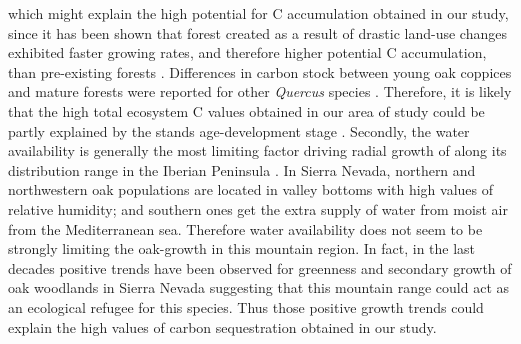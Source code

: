 which might explain the high potential for C accumulation obtained in our study, since it has been shown that forest created as a result of drastic land-use changes exhibited faster growing rates, and therefore higher potential C accumulation, than pre-existing forests \autocite{VilaCabreraetal2017NewForests}. Differences in carbon stock between young oak coppices and mature forests were reported for other \emph{Quercus} species \autocite{Bruckmanetal2011CarbonPools,Cotillasetal2016AbovegroundBelowground}. Therefore, it is likely that the high total ecosystem C values obtained in our area of study could be partly explained by the stands age-development stage \autocite{Makinecietal2015EcosystemCarbon}. Secondly, the water availability is generally the most limiting factor driving radial growth of \Qp along its distribution range in the Iberian Peninsula \autocite{GeaIzquierdoCanellas2014LocalClimate}. In Sierra Nevada, northern and northwestern oak populations are located in valley bottoms with high values of relative humidity; and southern ones get the extra supply of water from moist air from the Mediterranean sea. Therefore water availability does not seem to be strongly limiting the oak-growth in this mountain region. In fact, in the last decades positive trends have been observed for greenness and secondary growth of oak woodlands in Sierra Nevada \autocite{GeaIzquierdoCanellas2014LocalClimate,PerezLuqueetal2020LanduseLegacies,RubioCuadradoetal2018AbioticFactors} suggesting that this mountain range could act as an ecological refugee for this species. Thus those positive growth trends could explain the high values of carbon sequestration obtained in our study.

